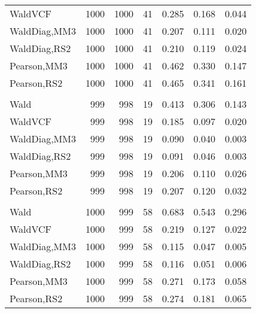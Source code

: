 \documentclass[
]{article}
\begin{document}
\begin{table}[H]
{\begin{tabular}[t]{lrrrrrr}
\hspace{1em}WaldVCF & 1000 & 1000 & 41 & 0.285 & 0.168 & 0.044\\
\hspace{1em}WaldDiag,MM3 & 1000 & 1000 & 41 & 0.207 & 0.111 & 0.020\\
\hspace{1em}WaldDiag,RS2 & 1000 & 1000 & 41 & 0.210 & 0.119 & 0.024\\
\hspace{1em}Pearson,MM3 & 1000 & 1000 & 41 & 0.462 & 0.330 & 0.147\\
\hspace{1em}Pearson,RS2 & 1000 & 1000 & 41 & 0.465 & 0.341 & 0.161\\
\addlinespace[0.3em]
\multicolumn{7}{l}{\textbf{2F 10V}}\\
\hspace{1em}Wald & 999 & 998 & 19 & 0.413 & 0.306 & 0.143\\
\hspace{1em}WaldVCF & 999 & 998 & 19 & 0.185 & 0.097 & 0.020\\
\hspace{1em}WaldDiag,MM3 & 999 & 998 & 19 & 0.090 & 0.040 & 0.003\\
\hspace{1em}WaldDiag,RS2 & 999 & 998 & 19 & 0.091 & 0.046 & 0.003\\
\hspace{1em}Pearson,MM3 & 999 & 998 & 19 & 0.206 & 0.110 & 0.026\\
\hspace{1em}Pearson,RS2 & 999 & 998 & 19 & 0.207 & 0.120 & 0.032\\
\addlinespace[0.3em]
\multicolumn{7}{l}{\textbf{3F 15V}}\\
\hspace{1em}Wald & 1000 & 999 & 58 & 0.683 & 0.543 & 0.296\\
\hspace{1em}WaldVCF & 1000 & 999 & 58 & 0.219 & 0.127 & 0.022\\
\hspace{1em}WaldDiag,MM3 & 1000 & 999 & 58 & 0.115 & 0.047 & 0.005\\
\hspace{1em}WaldDiag,RS2 & 1000 & 999 & 58 & 0.116 & 0.051 & 0.006\\
\hspace{1em}Pearson,MM3 & 1000 & 999 & 58 & 0.271 & 0.173 & 0.058\\
\hspace{1em}Pearson,RS2 & 1000 & 999 & 58 & 0.274 & 0.181 & 0.065\\
\bottomrule
\end{tabular}}
\endgroup{}
\end{table}
\end{document}
